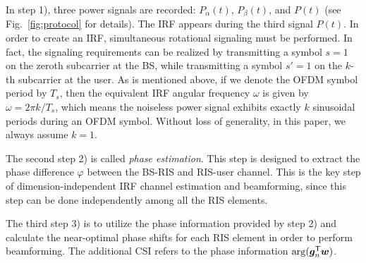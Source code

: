 \documentclass[journal,twocolumn]{IEEEtran}
\theoremstyle{nonumberplain}
\def \T {\bm \Theta}
\def \T {^{\mathsf{T}}}
\newcommand{\red}[1]{{\color{red}{#1}}}
\begin{document}
    In step 1), three power signals are recorded: $P_{\alpha}(t)$, $P_{\beta}(t)$, and $P(t)$ (see Fig.~\ref{fig:protocol} for details). The IRF appears during the third signal $P(t)$. 
    In order to create an IRF, simultaneous rotational signaling must be performed. 
    In fact, the signaling requirements can be realized by transmitting a symbol $s=1$ on the zeroth subcarrier at the BS, while transmitting a symbol $s'=1$ on the $k$-th subcarrier at the user. 
    As is mentioned above, if we denote the OFDM symbol period by $T_s$, then the equivalent IRF angular frequency $\omega$ is given by $\omega = 2\pi k /T_s$, which means the noiseless power signal exhibits exactly $k$ sinusoidal periods during an OFDM symbol. 
    Without loss of generality, in this paper, we always assume $k=1$. 
    \red{In fact, for multi-antenna MIMO systems, rotating pilot symbols at different frequencies $k$ can be simultaneously transmitted by different antennas to enable CSI acquisition.  
    Then, the multi-antenna CSI acquisition can be fulfilled by performing Fourier analysis on the composite IRF power signal $P(t)$, and extracting the phase angles for each antenna at distinct frequencies. 
    Similarly, this pseudo-frequency division idea can be extended to multi-user MIMO systems, where different users can also be distinguished by different IRF frequencies. Fortunately, since different users are usually separated in the angular domain from the RIS's perspective, these users can be further identified by performing joint detection and estimation across all the RIS sensors. The joint CSI estimation is beyond the scope of this paper, and is left for our future work. }

    The second step 2) is called {\it phase estimation}. This step is designed to extract the phase difference $\varphi$ between the BS-RIS and RIS-user channel. 
    This is the key step of dimension-independent IRF channel estimation and beamforming, since this step can be done independently among all the RIS elements. 

    The third step 3) is to utilize the phase information provided by step 2) and calculate the near-optimal phase shifts for each RIS element in order to perform beamforming. The additional CSI refers to the phase information ${\rm arg}({\bm g}_n\T {\bm w})$. 
\end{document}

